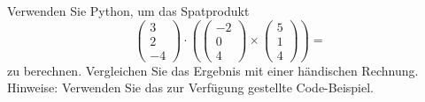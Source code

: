 \begin{ExerciseBlock}
Verwenden Sie Python, um das Spatprodukt 
\begin{equation*}
	\left(\begin{array}{c} 3 \\ 2 \\ -4 \end{array}\right)
	\cdot \left( 
	\left(\begin{array}{c} -2 \\ 0 \\ 4 \end{array}\right)
	\times
	\left(\begin{array}{c} 5 \\ 1 \\ 4 \end{array}\right)
	\right) = 
\end{equation*}
zu berechnen. Vergleichen Sie das Ergebnis mit einer händischen Rechnung. \\
Hinweise: Verwenden Sie das zur Verfügung gestellte Code-Beispiel.
\end{ExerciseBlock}
